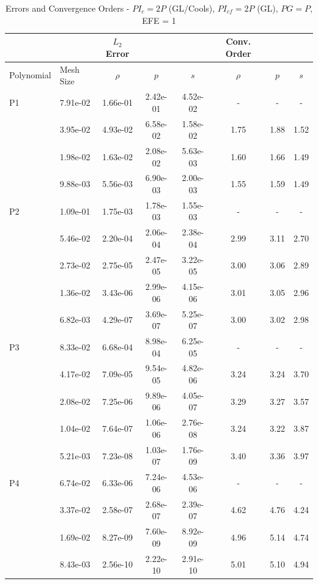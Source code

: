 \documentclass[12pt,Bold,letterpaper,TexShade]{mcgilletdclass}
\numberwithin{equation}{section}
\begin{document}
\begin {table}[!htbp]
\begin{center}
\begin{tabular}{| l | l | c c c | c c c |}
	\hline
	 & & $L_2$ Error & & & Conv. Order & & \\
	\hline
	Polynomial & Mesh Size & $\rho$ & $p$     & $s$     & $\rho$ & $p$     & $s$     \\
	\hline
P1	& 7.91e-02 & 1.66e-01 & 2.42e-01 & 4.52e-02 & - & - & - \\
	& 3.95e-02 & 4.93e-02 & 6.58e-02 & 1.58e-02 & 1.75 & 1.88 & 1.52 \\
	& 1.98e-02 & 1.63e-02 & 2.08e-02 & 5.63e-03 & 1.60 & 1.66 & 1.49 \\
	& 9.88e-03 & 5.56e-03 & 6.90e-03 & 2.00e-03 & 1.55 & 1.59 & 1.49 \\
	\hline
P2	& 1.09e-01 & 1.75e-03 & 1.78e-03 & 1.55e-03 & - & - & - \\
	& 5.46e-02 & 2.20e-04 & 2.06e-04 & 2.38e-04 & 2.99 & 3.11 & 2.70 \\
	& 2.73e-02 & 2.75e-05 & 2.47e-05 & 3.22e-05 & 3.00 & 3.06 & 2.89 \\
	& 1.36e-02 & 3.43e-06 & 2.99e-06 & 4.15e-06 & 3.01 & 3.05 & 2.96 \\
	& 6.82e-03 & 4.29e-07 & 3.69e-07 & 5.25e-07 & 3.00 & 3.02 & 2.98 \\
	\hline
P3	& 8.33e-02 & 6.68e-04 & 8.98e-04 & 6.25e-05 & - & - & - \\
	& 4.17e-02 & 7.09e-05 & 9.54e-05 & 4.82e-06 & 3.24 & 3.24 & 3.70 \\
	& 2.08e-02 & 7.25e-06 & 9.89e-06 & 4.05e-07 & 3.29 & 3.27 & 3.57 \\
	& 1.04e-02 & 7.64e-07 & 1.06e-06 & 2.76e-08 & 3.24 & 3.22 & 3.87 \\
	& 5.21e-03 & 7.23e-08 & 1.03e-07 & 1.76e-09 & 3.40 & 3.36 & 3.97 \\
	\hline
P4	& 6.74e-02 & 6.33e-06 & 7.24e-06 & 4.53e-06 & - & - & - \\
	& 3.37e-02 & 2.58e-07 & 2.68e-07 & 2.39e-07 & 4.62 & 4.76 & 4.24 \\
	& 1.69e-02 & 8.27e-09 & 7.60e-09 & 8.92e-09 & 4.96 & 5.14 & 4.74 \\
	& 8.43e-03 & 2.56e-10 & 2.22e-10 & 2.91e-10 & 5.01 & 5.10 & 4.94 \\
	\hline
\end{tabular}
\caption{Errors and Convergence Orders - $PI_c  = 2P$ (GL/Cools), $PI_{cf} = 2P$ (GL), $PG = P$, EFE = 1}
\label{tab:SM_PIc=2P(GL/Cools)_PIcf=2P(GL)_PG=P_EFE=1}
\end{center}
\end{table}
\end{document}
